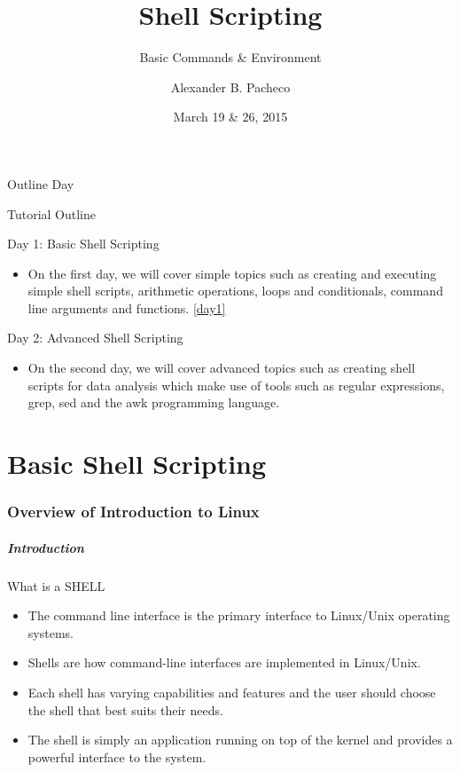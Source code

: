 \documentclass[10pt,t]{beamer}
\title{Shell Scripting}
\subtitle{Basic Commands \& Environment}
\author{Alexander B. Pacheco}
\institute{\href{http://researchcomputing.lehigh.edu}{LTS Research Computing}}%
\date{March 19 \& 26, 2015}%
\begin{document}
\begin{frame}
  \titlepage
\end{frame}

\footnotesize
\begin{frame}[allowframebreaks]{Outline Day}
  \tableofcontents[part=1,hideallsubsections]
  \framebreak
  \tableofcontents[part=2,hideallsubsections]
\end{frame}

\begin{frame}[c]{Tutorial Outline}
  \begin{exampleblock}{Day 1: Basic Shell Scripting}
    \begin{itemize}
      \item[] On the first day, we will cover simple topics such as creating and executing simple shell scripts, arithmetic operations, loops and conditionals, command line arguments and functions.
        \ref{day1}
    \end{itemize}
  \end{exampleblock}
  \begin{exampleblock}{Day 2: Advanced Shell Scripting}
    \begin{itemize}
      \item[] On the second day, we will cover advanced topics such as creating shell scripts for data analysis which make use of tools such as regular expressions, grep, sed and the awk programming language.
    \end{itemize}
  \end{exampleblock}
\end{frame}

\part[Day 1]{Basic Shell Scripting}
\section{Overview of Introduction to Linux}
\begin{frame}[label=day1]
  \frametitle{Introduction}
  \begin{exampleblock}{What is a SHELL}
    \begin{itemize}
      \item The command line interface is the primary interface to Linux/Unix operating systems.
      \item Shells are how command-line interfaces are implemented in Linux/Unix.
      \item Each shell has varying capabilities and features and the user should choose the shell that best suits their needs.
      \item The shell is simply an application running on top of the kernel and provides a powerful interface to the system.
    \end{itemize}
  \end{exampleblock}
\end{frame}
\end{document}
